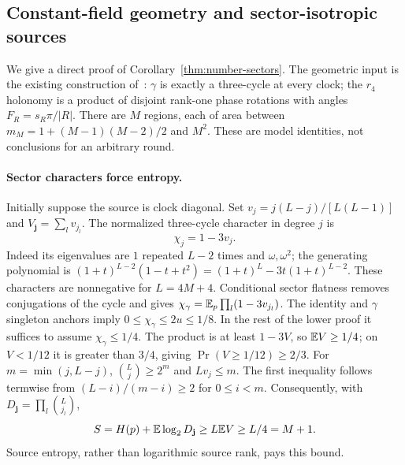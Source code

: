 \subsection{Constant-field geometry and sector-isotropic sources}

We give a direct proof of Corollary~\ref{thm:number-sectors}. The geometric input is
the existing construction of~\cite[Section~6.2]{DouglasMghirbiA}:
$\gamma$ is exactly a three-cycle at every clock; the $r_4$ holonomy
is a product of disjoint rank-one phase rotations with angles
$F_R=s_R\pi/|R|$. There are $M$ regions, each of area between
$m_M=1+(M-1)(M-2)/2$ and $M^2$. These are model identities,
not conclusions for an arbitrary round.

\paragraph{Sector characters force entropy.}
Initially suppose the source is clock diagonal. Set
$v_j=j(L-j)/[L(L-1)]$ and $V_{\mathbf j}=\sum_l v_{j_l}$.
The normalized three-cycle character in degree $j$ is
\[
 \chi_j=1-3v_j.
\]
Indeed its eigenvalues are $1$ repeated $L-2$ times and
$\omega,\omega^2$; the generating polynomial is
$(1+t)^{L-2}(1-t+t^2)=(1+t)^L-3t(1+t)^{L-2}$.
These characters are nonnegative for $L=4M+4$. Conditional sector
flatness removes conjugations of the cycle and gives
$\chi_\gamma=\mathbb E_p\prod_l(1-3v_{j_l})$.
The identity and $\gamma$ singleton anchors imply
$0\leq\chi_\gamma\leq2u\leq1/8$.
In the rest of the lower proof it suffices to assume
$\chi_\gamma\leq1/4$. The product is at least $1-3V$, so
$\mathbb E V\geq1/4$; on $V<1/12$ it is greater than $3/4$,
giving $\Pr(V\geq1/12)\geq2/3$.
For $m=\min(j,L-j)$, $\binom Lj\geq2^m$ and $Lv_j\leq m$.
The first inequality follows termwise from
$(L-i)/(m-i)\geq2$ for $0\leq i<m$.
Consequently, with $D_{\mathbf j}=\prod_l\binom L{j_l}$,
\begin{equation}\label{eq:sector-entropy-floor}
 S=H(p)+\mathbb E\log_2D_{\mathbf j}\geq L\mathbb E V\geq L/4=M+1.
\end{equation}
Source entropy, rather than logarithmic source rank, pays this bound.

